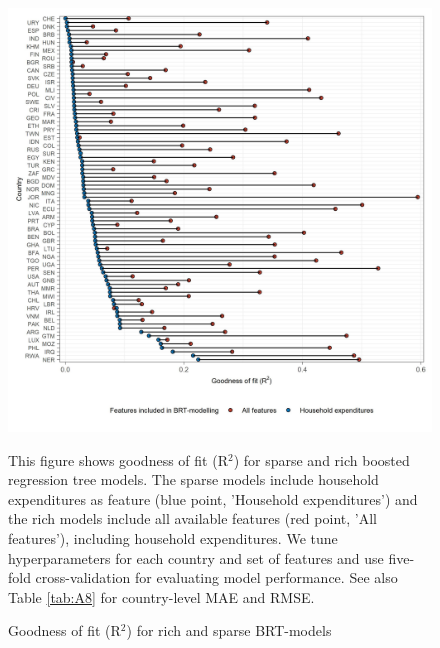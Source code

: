 \documentclass[12pt, a4paper]{article}
\newenvironment{subcaption2}
{\strut
\vspace{-5pt}
\begin{minipage}[b]{0.9\textwidth}
  \hspace*{-\parindent}
  \footnotesize}
 {\end{minipage}}
\begin{document}
\begin{figure}[ht!]
    \centering
    \caption{Goodness of fit (R$^{2}$) for rich and sparse BRT-models}\label{fig:comparison}
    \includegraphics[width=\textwidth]{1_Figures/Figures_Appendix/Figure_Comparison_Models.jpg}
    \label{fig:comparison_models}
    \begin{subcaption2}
    This figure shows goodness of fit (R$^{2}$) for sparse and rich boosted regression tree models. The sparse models include household expenditures as feature (blue point, 'Household expenditures') and the rich models include all available features (red point, 'All features'), including household expenditures. We tune hyperparameters for each country and set of features and use five-fold cross-validation for evaluating model performance. See also Table \ref{tab:A8} for country-level MAE and RMSE.
    \end{subcaption2}
\end{figure}

\clearpage


\clearpage


\clearpage
\end{document}
